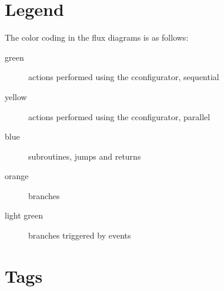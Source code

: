 \documentclass[a4paper]{article}
\begin{document}
\section*{Legend}

The color coding in the flux diagrams is as follows:
\begin{description}
\item[green] actions performed using the cconfigurator, sequential
\item[yellow] actions performed using the cconfigurator, parallel
\item[blue] subroutines, jumps and returns
\item[orange] branches
\item[light green] branches triggered by events
\end{description}

\section*{Tags}
\end{document}

